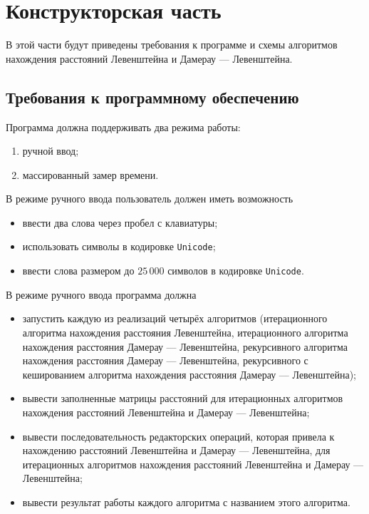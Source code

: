\section{Конструкторская часть}

В этой части будут приведены требования к программе и схемы алгоритмов нахождения расстояний Левенштейна и Дамерау --- Левенштейна.

\subsection{Требования к программному обеспечению}

Программа должна поддерживать два режима работы:
\begin{enumerate}
    \item ручной ввод;
    \item массированный замер времени.
\end{enumerate}

В режиме ручного ввода пользователь должен иметь возможность
\begin{itemize}
    \item ввести два слова через пробел с клавиатуры;
    \item использовать символы в кодировке \texttt{Unicode};
    \item ввести слова размером до $25\,000$ символов в кодировке \texttt{Unicode}.
\end{itemize}

В режиме ручного ввода программа должна
\begin{itemize}
    \item запустить каждую из реализаций четырёх алгоритмов (итерационного алгоритма нахождения расстояния Левенштейна, итерационного алгоритма нахождения расстояния Дамерау --- Левенштейна, рекурсивного алгоритма нахождения расстояния Дамерау --- Левенштейна, рекурсивного с кешированием алгоритма нахождения расстояния Дамерау --- Левенштейна);
    \item вывести заполненные матрицы расстояний для итерационных алгоритмов нахождения расстояний Левенштейна и Дамерау --- Левенштейна;
    \item вывести последовательность редакторских операций, которая привела к нахождению расстояний Левенштейна и Дамерау --- Левенштейна, для итерационных алгоритмов нахождения расстояний Левенштейна и Дамерау --- Левенштейна;
    \item вывести результат работы каждого алгоритма с названием этого алгоритма.
\end{itemize}

